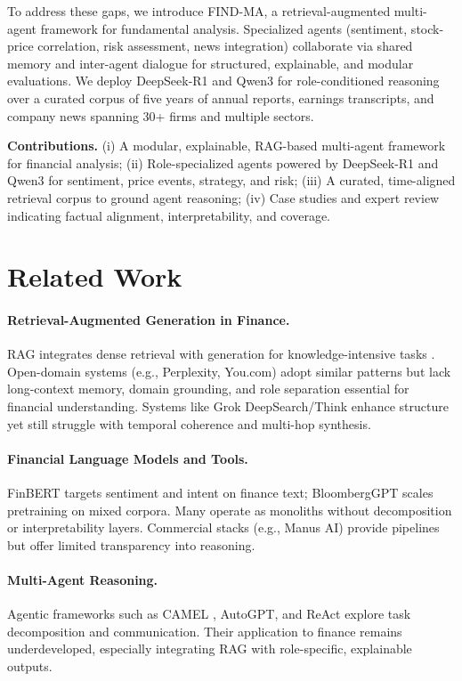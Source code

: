 \documentclass[11pt]{article}
\newcommand{\findma}{\textsc{FIND-MA}}
\begin{document}
To address these gaps, we introduce \findma{}, a retrieval-augmented multi-agent framework for fundamental analysis. Specialized agents (sentiment, stock-price correlation, risk assessment, news integration) collaborate via shared memory and inter-agent dialogue for structured, explainable, and modular evaluations. We deploy DeepSeek-R1 and Qwen3 for role-conditioned reasoning over a curated corpus of five years of annual reports, earnings transcripts, and company news spanning 30+ firms and multiple sectors.

\textbf{Contributions.} (i) A modular, explainable, RAG-based multi-agent framework for financial analysis; (ii) Role-specialized agents powered by DeepSeek-R1 and Qwen3 for sentiment, price events, strategy, and risk; (iii) A curated, time-aligned retrieval corpus to ground agent reasoning; (iv) Case studies and expert review indicating factual alignment, interpretability, and coverage.

\section{Related Work}
\label{sec:related}
\paragraph{Retrieval-Augmented Generation in Finance.}
RAG integrates dense retrieval with generation for knowledge-intensive tasks \citep{lewis2020retrieval}. Open-domain systems (e.g., Perplexity, You.com) adopt similar patterns but lack long-context memory, domain grounding, and role separation essential for financial understanding. Systems like Grok DeepSearch/Think enhance structure yet still struggle with temporal coherence and multi-hop synthesis.

\paragraph{Financial Language Models and Tools.}
FinBERT \citep{araci2019finbert} targets sentiment and intent on finance text; BloombergGPT \citep{wu2023bloomberggpt} scales pretraining on mixed corpora. Many operate as monoliths without decomposition or interpretability layers. Commercial stacks (e.g., Manus AI) provide pipelines but offer limited transparency into reasoning.

\paragraph{Multi-Agent Reasoning.}
Agentic frameworks such as CAMEL \citep{li2023camel}, AutoGPT, and ReAct \citep{yao2023react} explore task decomposition and communication. Their application to finance remains underdeveloped, especially integrating RAG with role-specific, explainable outputs.
\end{document}
